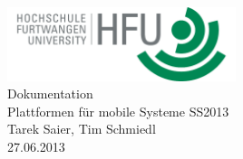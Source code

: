 \documentclass[pdftex,fontsize=11pt,a4paper]{scrbook}
\begin{document}
\begin{titlepage}
\thispagestyle{empty}
\begin{center}
\includegraphics[width=0.5\textwidth]{hfu.png}~\\[1.5cm]
\Huge Dokumentation\\[0.4cm]
\Huge Plattformen für mobile Systeme SS2013\\[1cm]
\LARGE Tarek Saier, Tim Schmiedl\\[0.2cm]
\normalsize 27.06.2013
\end{center}
\end{titlepage}
\end{document}
